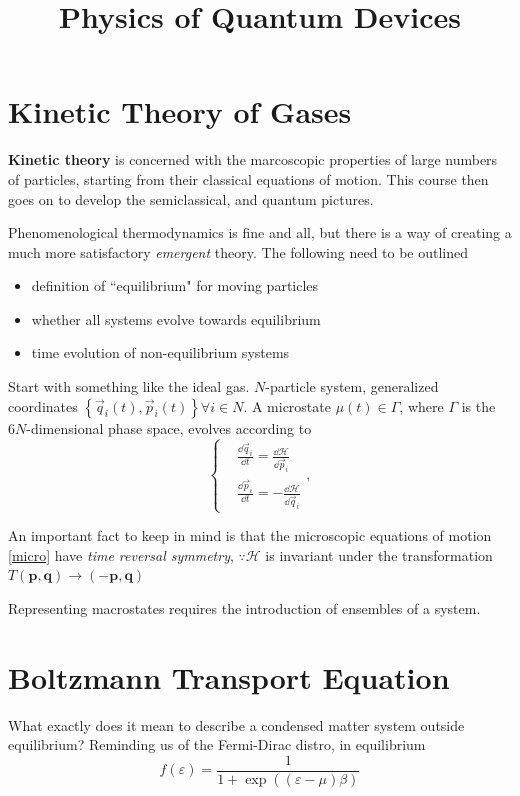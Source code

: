 \documentclass[a4paper]{article}
\title{Physics of Quantum Devices}
\date{}
\begin{document}
\maketitle
\section*{Kinetic Theory of Gases}
\textbf{Kinetic theory} is concerned with the marcoscopic properties
of large numbers of particles, starting from their classical equations
of motion. This course then goes on to develop the semiclassical, and
quantum pictures.

Phenomenological thermodynamics is fine and all, but there is a way
of creating a much more satisfactory \emph{emergent} theory. The
following need to be outlined
\begin{itemize}
	\item definition of ``equilibrium" for moving particles
	\item whether all systems evolve towards equilibrium
	\item time evolution of non-equilibrium systems
\end{itemize}

Start with something like the ideal gas. $N$-particle system, generalized
coordinates $\left\{ \vec{q}_i(t), \vec{p}_i(t) \right\} \forall i \in N$.
A microstate $\mu(t) \in \Gamma$, where $\Gamma$ is the $6N$-dimensional
phase space, evolves according to
\begin{equation} \label{micro}
	\begin{cases}
		&\frac{\dd \vec{q}_i}{\dd t} = \frac{\dd \mathcal{H}}{\dd \vec{p}_i} \\
		&\frac{\dd \vec{p}_i}{\dd t}= -\frac{\dd \mathcal{H}}{\dd \vec{q}_i}
	\end{cases},
\end{equation}

An important fact to keep in mind is that the microscopic equations
of motion \ref{micro} have \emph{time reversal symmetry}, $\because \mathcal{H}$ is invariant under the transformation $T(\mathbf{p, q}) 
\to (-\mathbf{p, q})$

Representing macrostates requires the introduction of ensembles of
a system.

\section*{Boltzmann Transport Equation}
What exactly does it mean to describe a condensed matter system
outside equilibrium? Reminding us of the Fermi-Dirac distro, in equilibrium
\begin{equation}
	f(\varepsilon) = \frac{1}{1 + \exp((\varepsilon - \mu)\beta)}
\end{equation}
\end{document}
